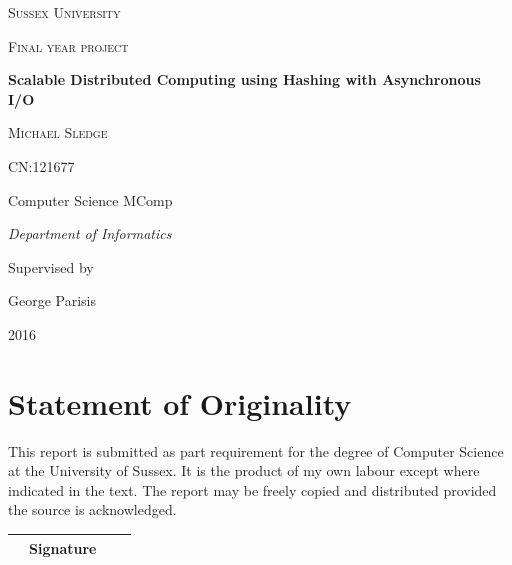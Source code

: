 \documentclass{article}
\begin{document}
\begin{titlepage}
	\centering
	{\scshape\LARGE Sussex University \par}
	\vspace{1cm}
	{\scshape\Large Final year project\par}
	\vspace{1.5cm}
	{\huge\bfseries Scalable Distributed Computing using Hashing with Asynchronous I/O\par}
	\vspace{2cm}
	{\Large\scshape Michael Sledge\par}
	{\Large CN:121677\par}
	\vspace{1cm}
	{\Large Computer Science MComp\par}
	{\Large\itshape Department of Informatics\par}
	\vspace{1cm}
	{Supervised by}\par
	{\large George Parisis}

	\vfill

	{\large 2016\par}
\end{titlepage}

\section*{Statement of Originality}
This report is submitted as part requirement for the degree of Computer Science at the University of Sussex. It is the product of my own labour except where indicated in the text. The report may be freely copied and distributed provided the source is acknowledged.
\begin{table}[b]
\centering
\bgroup
\def\arraystretch{2.5}
\begin{tabularx}{0.8\textwidth}{|l c l|X|}
\hline
& Signature & & \\\hline
\end{tabularx}
\egroup
\end{table}

\newpage
{}
\end{document}
